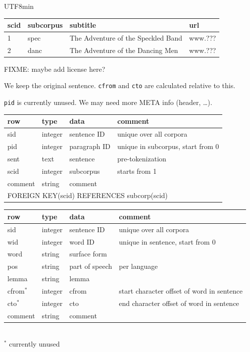 \documentclass[25pt,landscape,headrule,footrule,dvips]{foils}
\newcommand{\emp}[1]{\textcolor{red}{#1}}
\newcommand{\myslide}[1]{\foilhead[-25mm]{\raisebox{12mm}[0mm]{\emp{#1}}}}
\begin{document}
\begin{CJK}{UTF8}{min}
  \begin{tabular}{llll}
  \textbf{scid}   &  \textbf{subcorpus} & \textbf{subtitle} & \textbf{url} \\
  \hline
  1 & spec & The Adventure of the Speckled Band &  www.??? \\
  2 & danc & The Adventure of the Dancing Men &  www.??? 
\end{tabular}


FIXME: maybe add license here?


\myslide{Monolingual Sentence Information}

We keep the original sentence.  \texttt{cfrom} and \texttt{cto} are calculated relative to this.

\texttt{pid} is currently unused.  We may need more META info (header, \ldots).


\noindent  \begin{tabular}{llll}
  \textbf{row}   &  \textbf{type} & \textbf{data} & \textbf{comment} \\\hline
  sid   & integer & sentence ID & unique over all corpora\\
  pid   & integer & paragraph ID & unique in subcorpus, start from 0\\
  sent  & text    & sentence & pre-tokenization\\
  scid  & integer & subcorpus & starts from 1\\
  comment & string & comment \\
\multicolumn{4}{l}{FOREIGN KEY(scid) REFERENCES subcorp(scid)}

\end{tabular}


\myslide{Monolingual Word Information}


\noindent \begin{tabular}{llll}
  \textbf{row}   &  \textbf{type} & \textbf{data} & \textbf{comment} \\\hline
  sid   & integer & sentence ID & unique over all corpora\\
  wid   & integer & word ID & unique in sentence, start from 0\\
  word  & string  & surface form &  \\
  pos   & string  & part of speech & per language  \\
  lemma & string  & lemma \\
  cfrom$^*$ & integer & cfrom & start character offset of word in sentence \\
  cto$^*$ & integer & cto & end character offset of word in sentence \\
  comment & string & comment \\
\hline
\end{tabular}
\\ $^*$ currently unused



\end{CJK}
\end{document}
